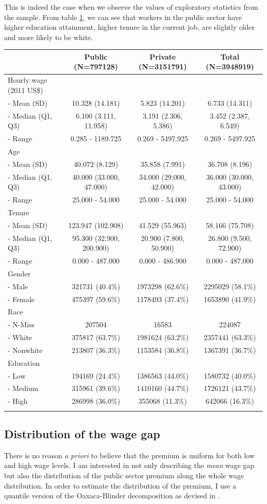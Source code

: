 \documentclass{article}
\begin{document}
\noindent
This is indeed the case when we observe the values of exploratory statistics from the sample. From table \ref{table:all}, we can see that workers in the public sector have higher education attainment, higher tenure in the current job, are slightly older and more likely to be white.   

\begin{longtable}[c]{@{}lccc@{}}
\toprule
& Public (N=797128) & Private (N=3151791) & Total
(N=3948919)\tabularnewline
\midrule
\endhead
Hourly wage (2011 US\$) & & &\tabularnewline
- Mean (SD) & 10.328 (14.181) & 5.823 (14.201) & 6.733
(14.311)\tabularnewline
- Median (Q1, Q3) & 6.100 (3.111, 11.958) & 3.191 (2.306, 5.386) & 3.452
(2.387, 6.549)\tabularnewline
- Range & 0.285 - 1189.725 & 0.269 - 5497.925 & 0.269 -
5497.925\tabularnewline
Age & & &\tabularnewline
- Mean (SD) & 40.072 (8.129) & 35.858 (7.991) & 36.708
(8.196)\tabularnewline
- Median (Q1, Q3) & 40.000 (33.000, 47.000) & 34.000 (29.000, 42.000) &
36.000 (30.000, 43.000)\tabularnewline
- Range & 25.000 - 54.000 & 25.000 - 54.000 & 25.000 -
54.000\tabularnewline
Tenure & & &\tabularnewline
- Mean (SD) & 123.947 (102.908) & 41.529 (55.963) & 58.166
(75.708)\tabularnewline
- Median (Q1, Q3) & 95.300 (32.900, 200.900) & 20.900 (7.800, 50.900) &
26.800 (9.500, 72.900)\tabularnewline
- Range & 0.000 - 487.000 & 0.000 - 486.900 & 0.000 -
487.000\tabularnewline
Gender & & &\tabularnewline
- Male & 321731 (40.4\%) & 1973298 (62.6\%) & 2295029
(58.1\%)\tabularnewline
- Female & 475397 (59.6\%) & 1178493 (37.4\%) & 1653890
(41.9\%)\tabularnewline
Race & & &\tabularnewline
- N-Miss & 207504 & 16583 & 224087\tabularnewline
- White & 375817 (63.7\%) & 1981624 (63.2\%) & 2357441
(63.3\%)\tabularnewline
- Nonwhite & 213807 (36.3\%) & 1153584 (36.8\%) & 1367391
(36.7\%)\tabularnewline
Education & & &\tabularnewline
- Low & 194169 (24.4\%) & 1386563 (44.0\%) & 1580732
(40.0\%)\tabularnewline
- Medium & 315961 (39.6\%) & 1410160 (44.7\%) & 1726121
(43.7\%)\tabularnewline
- High & 286998 (36.0\%) & 355068 (11.3\%) & 642066
(16.3\%)\tabularnewline
\bottomrule
\label{table:all}
\end{longtable}

\subsection{Distribution of the wage gap}   
There is no reason \emph{a priori} to believe that the premium is uniform for both low and high wage levels. I am interested in not only describing the \emph{mean} wage gap but also the distribution of the public sector premium along the whole wage distribution. In order to estimate the distribution of the premium, I use a quantile version of the Oaxaca-Blinder decomposition as devised in \cite{chernozhukov_inference_2013}.\\
\end{document}
